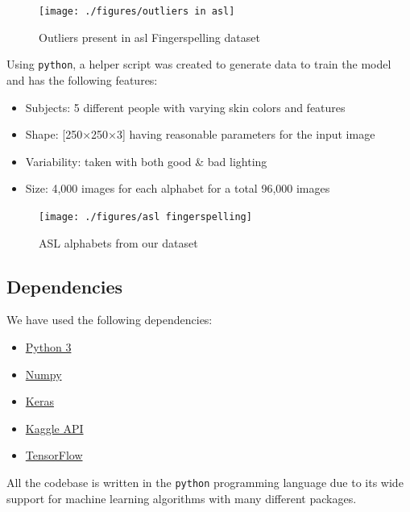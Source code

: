 \documentclass[twocolumn]{article}
\begin{document}
\begin{figure}[h]
\centering
\texttt{[image: ./figures/outliers in asl]}
\caption{Outliers present in \gls{asl} Fingerspelling dataset \cite{pugeault2011spelling}}
\end{figure}

Using \texttt{python}, a helper script was created to generate data to train 
the model and has the following features:
\begin{itemize}
	\item Subjects: 5 different people with varying skin colors and features
	\item Shape: [250×250×3] having reasonable parameters for the input image
	\item Variability: taken with both good \& bad lighting
	\item Size: 4,000 images for each alphabet for a total 96,000 images
\end{itemize}

\begin{figure}[h]
\centering
\texttt{[image: ./figures/asl fingerspelling]}
\caption{ASL alphabets from our dataset}
\end{figure}

\subsection{Dependencies}

We have used the following dependencies:
\begin{itemize}
	\item \href{https://www.python.org/downloads/}{Python 3}
	\item \href{https://www.scipy.org/install.html}{Numpy}
	\item \href{https://keras.io/#installation}{Keras}
	\item \href{https://github.com/Kaggle/kaggle-api}{Kaggle API}
	\item \href{https://www.tensorflow.org/install}{TensorFlow}
\end{itemize}

All the codebase is written in the \texttt{python} programming language due to 
its wide support for machine learning algorithms with many different packages.
\end{document}
